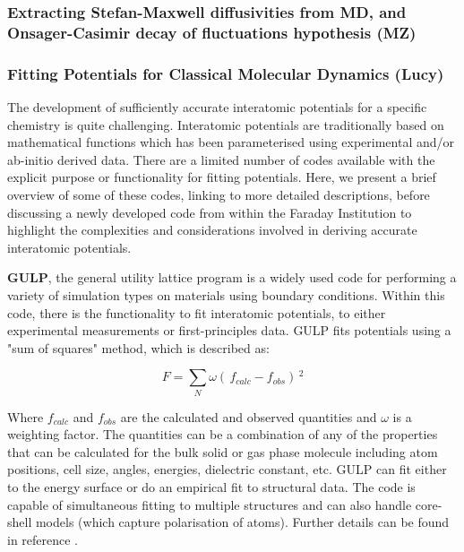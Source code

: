 \documentclass[journal=jacsat,manuscript=article]{achemso}
\begin{document}
\subsubsection{Extracting Stefan-Maxwell diffusivities from MD, and Onsager-Casimir decay of fluctuations hypothesis (MZ)}



\subsubsection{Fitting Potentials for Classical Molecular Dynamics (Lucy)}
\label{sec:potential_fitting}
The development of sufficiently accurate interatomic potentials for a specific chemistry is quite challenging. Interatomic potentials are traditionally based on mathematical functions which has been parameterised using experimental and/or ab-initio derived data. \cite{jones_1924, buckingham_classical_1938} There are a limited number of codes available with the explicit purpose or functionality for fitting potentials. Here, we present a brief overview of some of these codes, linking to more detailed descriptions, before discussing a newly developed code from within the Faraday Institution to highlight the complexities and considerations involved in deriving accurate interatomic potentials.

\textbf{GULP}, the general utility lattice program is a widely used code for performing a variety of simulation types on materials using boundary conditions. \cite{gale_gulp_1997} Within this code, there is the functionality to fit interatomic potentials, to either experimental measurements or first-principles data.\cite{gale_empirical_1996} GULP fits potentials using a "sum of squares" method, which is described as:

\begin{equation}
    F = \sum_{N} \omega ( \,f_{calc}-f_{obs} ) \,^2
\end{equation}

Where $f_{calc}$ and $f_{obs}$ are the calculated and observed quantities and $\omega$ is a weighting factor. The quantities can be a combination of any of the properties that can be calculated for the bulk solid or gas phase molecule including atom positions, cell size, angles, energies, dielectric constant, etc. GULP can fit either to the energy surface or do an empirical fit to structural data. The code is capable of simultaneous fitting to multiple structures and can also handle core-shell models (which capture polarisation of atoms). Further details can be found in reference .
\end{document}
